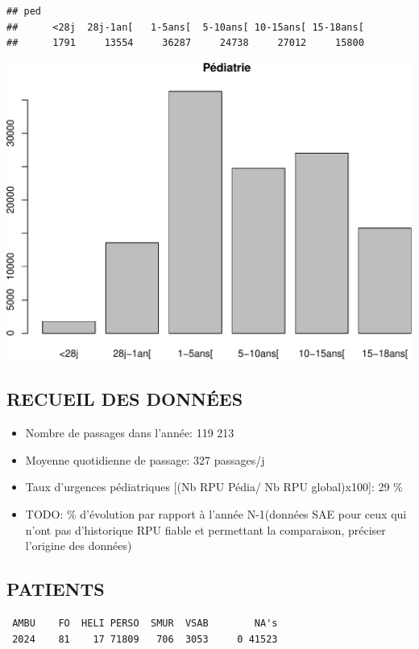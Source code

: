 \documentclass[]{article}
\begin{document}
\begin{verbatim}
## ped
##      <28j  28j-1an[   1-5ans[  5-10ans[ 10-15ans[ 15-18ans[ 
##      1791     13554     36287     24738     27012     15800
\end{verbatim}

\includegraphics{rapport2014_V4_files/figure-latex/pop18-1.pdf}

\subsection{RECUEIL DES DONNÉES}\label{recueil-des-donnees-1}

\begin{itemize}
\itemsep1pt\parskip0pt
\item
  Nombre de passages dans l'année: 119 213
\item
  Moyenne quotidienne de passage: 327 passages/j
\item
  Taux d'urgences pédiatriques {[}(Nb RPU Pédia/ Nb RPU global)x100{]}:
  29 \%
\item
  TODO: \% d'évolution par rapport à l'année N-1(données SAE pour ceux
  qui n'ont pas d'historique RPU fiable et permettant la comparaison,
  préciser l'origine des données)
\end{itemize}

\subsection{PATIENTS}\label{patients-1}

\begin{verbatim}
 AMBU    FO  HELI PERSO  SMUR  VSAB        NA's 
 2024    81    17 71809   706  3053     0 41523 
\end{verbatim}
\end{document}
